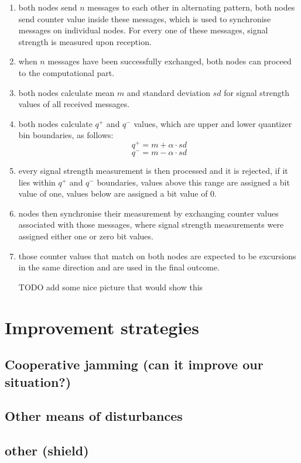\documentclass[
  print, %
  table,   %
  nolof,     %
  nolot,     %
           oneside
]{fithesis3}
\begin{document}
    \begin{enumerate}
      \item both nodes send $n$ messages to each other in alternating pattern, both nodes send counter value inside these messages, which is used to synchronise messages on individual nodes. For every one of these messages, signal strength is measured upon reception.
      \item when $n$ messages have been successfully exchanged, both nodes can proceed to the computational part.
      \item both nodes calculate mean $m$ and standard deviation $sd$ for signal strength values of all received messages.
      \item both nodes calculate $q^+$ and $q^-$ values, which are upper and lower quantizer bin boundaries, as follows:
      $$q^+ = m + \alpha \cdot sd$$
      $$q^- = m - \alpha \cdot sd$$
      \item every signal strength measurement is then processed and it is rejected, if it lies within $q^+$ and $q^-$ boundaries, values above this range are assigned a bit value of one, values below are assigned a bit value of 0.
      \item nodes then synchronise their measurement by exchanging counter values associated with those messages, where signal strength measurements were assigned either one or zero bit values.
      \item those counter values that match on both nodes are expected to be excursions in the same direction and are used in the final outcome.

      TODO add some nice picture that would show this
    \end{enumerate}

  \section{Improvement strategies}
  \subsection{Cooperative jamming (can it improve our situation?)}\label{subsec:jammer}
  \subsection{Other means of disturbances}\label{subsec:people}
  \subsection{other (shield)}\label{subsec:shield}
\end{document}
